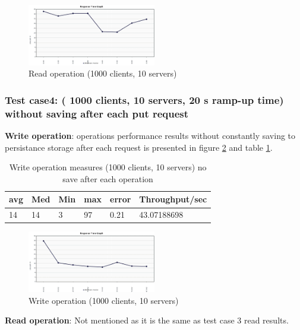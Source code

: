 \documentclass{sig-alternate}
\begin{document}
 \begin{center}
\begin{figure}[ht!]
\centering
     \includegraphics[width=0.5\textwidth]{get_10_1000_response.png}
\caption{Read operation (1000 clients, 10 servers) \label{get_10_1000}}
\end{figure}
\end{center}
\subsubsection{Test case4: ( 1000 clients, 10 servers, 20 s ramp-up time) without saving after each put request}
 \textbf{Write operation}: operations performance results without constantly saving to persistance storage after each request is presented in figure \ref{put_10_1000_nosave} and table \ref{put_10_1000_nosave_tbl}.
 \begin{table}[h]
\begin{tabular}{|l|l|l|l|l|l|}
\hline
\textbf{avg} & \textbf{Med} & \textbf{Min} & \textbf{max} & \textbf{error} & \textbf{Throughput/sec} \\ \hline
14 & 14 & 3 & 97 & 0.21 & 43.07188698 \\ \hline
\end{tabular}\caption{Write operation measures (1000 clients, 10 servers) no save after each operation}\label{put_10_1000_nosave_tbl}
\end{table}
 \begin{center}
\begin{figure}[ht!]
\centering
     \includegraphics[width=0.5\textwidth]{put_10_1000_response_nosave.png}
\caption{Write operation (1000 clients, 10 servers) \label{put_10_1000_nosave}}
\end{figure}
\end{center}
 \textbf{Read operation}:
Not mentioned as it is the same as test case 3 read results. 
\end{document}
